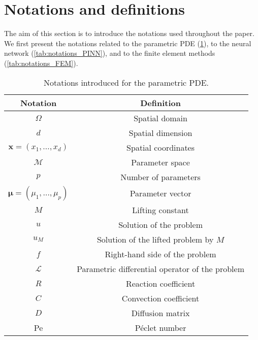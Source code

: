 \newpage
\section{Notations and definitions}\label{app:notations}

The aim of this section is to introduce the notations used throughout the paper. We first present the notations related to the parametric PDE (\cref{tab:notations_PDE}), to the neural network (\cref{tab:notations_PINN}), and to the finite element methods (\cref{tab:notations_FEM}).

\renewcommand{\arraystretch}{1.1}  %

\begin{table}[ht!]
    \centering
    \begin{tabular}{c|c}
        \textbf{Notation} & \textbf{Definition} \\
        \hline
        $\Omega$ & Spatial domain \\
        $d$ & Spatial dimension \\
        $\bm{x}=(x_1,\dots,x_d)$ & Spatial coordinates \\
        \hline
        $\mathcal{M}$ & Parameter space \\
        $p$ & Number of parameters \\
        $\bm{\mu}=(\mu_1,\ldots,\mu_p)$ & Parameter vector \\
        \hline
        $M$ & Lifting constant \\
        $u$ & Solution of the problem \\
        $u_M$ & Solution of the lifted problem by $M$ \\
        $f$ & Right-hand side of the problem \\
        $\mathcal{L}$ & Parametric differential operator of the problem \\
        $R$ & Reaction coefficient \\
        $C$ & Convection coefficient \\
        $D$ & Diffusion matrix \\
        Pe & Péclet number \\
    \end{tabular}
    \caption{Notations introduced for the parametric PDE.}
    \label{tab:notations_PDE}
\end{table}

